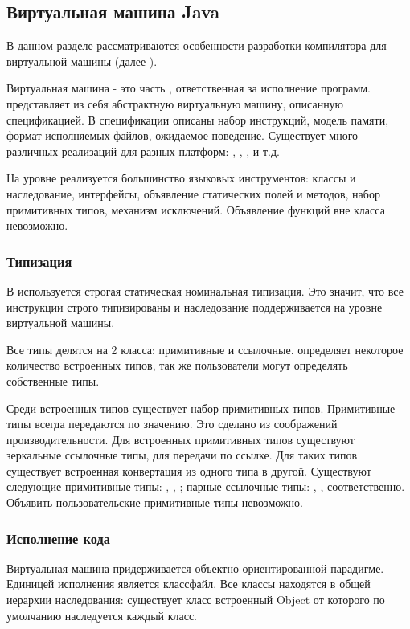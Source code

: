 \subsection{Виртуальная машина Java}
В данном разделе рассматриваются особенности разработки компилятора для виртуальной машины (далее ).

Виртуальная машина  - это часть , ответственная за исполнение программ.  представляет из себя абстрактную виртуальную машину, описанную спецификацией\cite{jvm:specification}. В спецификации описаны набор инструкций, модель памяти, формат исполняемых файлов, ожидаемое поведение. Существует много различных реализаций  для разных платформ: , , ,  и т.д.

На уровне  реализуется большинство языковых инструментов: классы и наследование, интерфейсы, объявление статических полей и методов, набор примитивных типов, механизм исключений. Объявление функций вне класса невозможно.

\subsubsection{Типизация}
В  используется строгая статическая номинальная типизация. Это значит, что все инструкции строго типизированы и наследование поддерживается на уровне виртуальной машины.

Все типы делятся на 2 класса: примитивные и ссылочные.  определяет некоторое количество встроенных типов, так же пользователи могут определять собственные типы.

Среди встроенных типов существует набор примитивных типов. Примитивные типы всегда передаются по значению. Это сделано из соображений производительности. Для встроенных примитивных типов существуют зеркальные ссылочные типы, для передачи по ссылке. Для таких типов существует встроенная конвертация из одного типа в другой. Существуют следующие примитивные типы: , , ; парные ссылочные типы: , ,  соответственно. Объявить пользовательские примитивные типы невозможно.

\subsubsection{Исполнение кода}
Виртуальная машина  придерживается объектно ориентированной парадигме. Единицей исполнения является классфайл. Все классы находятся в общей иерархии наследования: существует класс встроенный Object от которого по умолчанию наследуется каждый класс.

